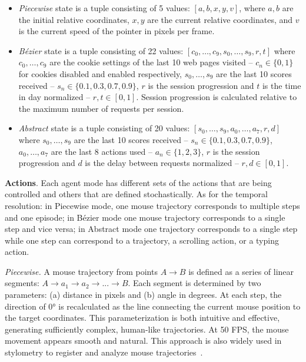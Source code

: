 \begin{itemize}
\item \emph{Piecewise} state is a tuple consisting of 5 values: $[a,b,x,y,v]$, where $a,b$ are the initial relative coordinates, $x,y$ are the current relative coordinates, and $v$ is the current speed of the pointer in pixels per frame.
\item \emph{Bézier} state is a tuple consisting of 22 values: $[c_0,\dots,c_9,s_0,\dots,s_9, r, t]$ where $c_0,\dots,c_9$ are the cookie settings of the last 10 web pages visited -- $c_n \in \{0,1\}$ for cookies disabled and enabled respectively, $s_0,\dots,s_9$ are the last 10 scores received -- $s_n \in \{0.1,0.3,0.7,0.9\}$, $r$ is the session progression and $t$ is the time in day normalized -- $r,t \in [0,1]$.
Session progression is calculated relative to the maximum number of requests per session.
\item \emph{Abstract} state is a tuple consisting of 20 values: $[s_0,\dots,s_9,a_0,\dots,a_7,r,d]$ where $s_0,\dots,s_9$ are the last 10 scores received -- $s_n \in \{0.1,0.3,0.7,0.9\}$, $a_0,\dots,a_7$ are the last 8 actions used -- $a_n \in \{1,2,3\}$, $r$ is the session progression and $d$ is the delay between requests normalized -- $r,d \in [0,1]$.
\end{itemize}

\textbf{Actions}. Each agent mode has different sets of the actions that are being controlled and others that are defined stochastically.
As for the temporal resolution: in Piecewise mode, one mouse trajectory corresponds to multiple steps and one episode; in Bézier mode one mouse trajectory corresponds to a single step and vice versa; in Abstract mode one trajectory corresponds to a single step while one step can correspond to a trajectory, a scrolling action, or a typing action.

\emph{Piecewise.} A mouse trajectory from points $A \rightarrow B$ is defined as a series of linear segments: $A \rightarrow a_1 \rightarrow a_2 \rightarrow ... \rightarrow B$.
Each segment is determined by two parameters: (a) distance in pixels and (b) angle in degrees.
At each step, the direction of \ang{0} is recalculated as the line connecting the current mouse position to the target coordinates.
This parameterization is both intuitive and effective, generating sufficiently complex, human-like trajectories.
At 50 FPS, the mouse movement appears smooth and natural.
This approach is also widely used in stylometry to register and analyze mouse trajectories~\cite{fridman2015multi}.

